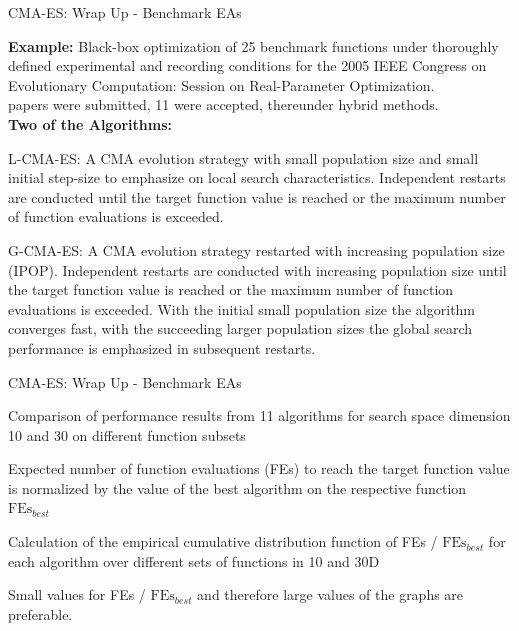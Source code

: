 \documentclass[11pt,compress,t,notes=noshow, xcolor=table]{beamer}
\begin{document}
\begin{framei}[fs=footnotesize]{CMA-ES: Wrap Up - Benchmark EAs}
\item \textbf{Example:} Black-box optimization of 25 benchmark functions under thoroughly defined experimental and recording conditions for the 2005 IEEE Congress on Evolutionary Computation: Session on Real-Parameter Optimization. \\
 papers were submitted, 11 were accepted, thereunder hybrid methods.\\
\textbf{Two of the Algorithms:}
\item L-CMA-ES: A CMA evolution strategy with small population size and small initial step-size to emphasize on local search characteristics. Independent restarts are conducted until the target function value is reached or the maximum number of function evaluations is exceeded. 
\item G-CMA-ES: A CMA evolution strategy restarted with increasing population size (IPOP). Independent restarts are conducted with increasing population size until the target function value is reached or the maximum number of function evaluations is exceeded. With the initial small population size the algorithm converges fast, with the succeeding larger population sizes the global search performance is emphasized in subsequent restarts. 
\end{framei}


\begin{framev}[fs=footnotesize]{CMA-ES: Wrap Up - Benchmark EAs}
\begin{itemizeS}
\item Comparison of performance results from 11 algorithms for search space dimension 10 and 30 on different function subsets
\item Expected number of function evaluations (FEs) to reach the target function value is normalized by the value of the best algorithm on the respective function $\text{FEs}_{best}$
\item Calculation of the empirical cumulative distribution function of FEs / $\text{FEs}_{best}$ for each algorithm over different sets of functions in 10 and 30D
\item Small values for FEs / $\text{FEs}_{best}$ and therefore large values of the graphs are preferable.
\end{itemizeS}
\end{framev}

\endlecture
\end{document}
